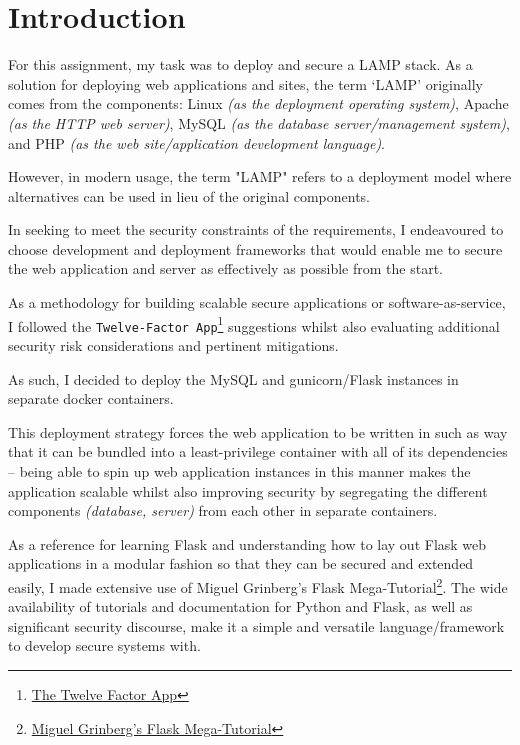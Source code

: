 \section{Introduction}
For this assignment, my task was to deploy and secure a LAMP stack. As a solution for deploying web applications and sites, the term `LAMP' originally comes from the components: Linux \textit{(as the deployment operating system)}, Apache \textit{(as the HTTP web server)}, MySQL \textit{(as the database server/management system)}, and PHP \textit{(as the web site/application development language)}.

However, in modern usage, the term "LAMP" refers to a deployment model where alternatives can be used in lieu of the original components.

In seeking to meet the security constraints of the requirements, I endeavoured to choose development and deployment frameworks that would enable me to secure the web application and server as effectively as possible from the start.

As a methodology for building scalable secure applications or software-as-service, I followed the \texttt{Twelve-Factor App}\footnote{\href{https://12factor.net/}{The Twelve Factor App}} suggestions whilst also evaluating additional security risk considerations and pertinent mitigations.

As such, I decided to deploy the MySQL and gunicorn/Flask instances in separate docker containers.

This deployment strategy forces the web application to be written in such as way that it can be bundled into a least-privilege container with all of its dependencies -- being able to spin up web application instances in this manner makes the application scalable whilst also improving security by segregating the different components \textit{(database, server)} from each other in separate containers.

As a reference for learning Flask and understanding how to lay out Flask web applications in a modular fashion so that they can be secured and extended easily, I made extensive use of Miguel Grinberg's Flask Mega-Tutorial\footnote{\href{https://blog.miguelgrinberg.com/post/the-flask-mega-tutorial-part-i-hello-world}{Miguel Grinberg's Flask Mega-Tutorial}}. The wide availability of tutorials and documentation for Python and Flask, as well as significant security discourse, make it a simple and versatile language/framework to develop secure systems with.

